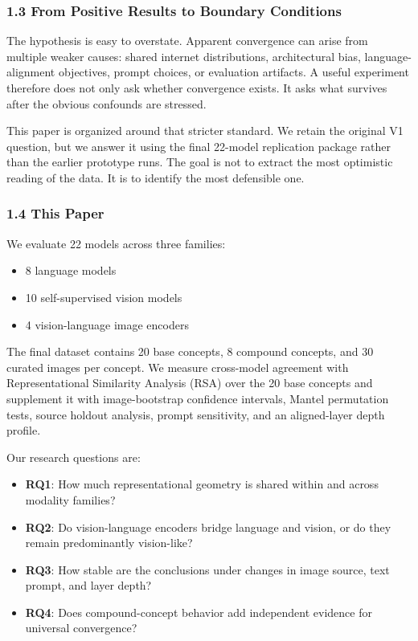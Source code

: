 \documentclass[
]{article}
\providecommand{\tightlist}{%
  \setlength{\itemsep}{0pt}\setlength{\parskip}{0pt}}
\begin{document}
\subsubsection{1.3 From Positive Results to Boundary
Conditions}\label{from-positive-results-to-boundary-conditions}

The hypothesis is easy to overstate. Apparent convergence can arise from
multiple weaker causes: shared internet distributions, architectural
bias, language-alignment objectives, prompt choices, or evaluation
artifacts. A useful experiment therefore does not only ask whether
convergence exists. It asks what survives after the obvious confounds
are stressed.

This paper is organized around that stricter standard. We retain the
original V1 question, but we answer it using the final 22-model
replication package rather than the earlier prototype runs. The goal is
not to extract the most optimistic reading of the data. It is to
identify the most defensible one.

\subsubsection{1.4 This Paper}\label{this-paper}

We evaluate 22 models across three families:

\begin{itemize}
\tightlist
\item
  8 language models
\item
  10 self-supervised vision models
\item
  4 vision-language image encoders
\end{itemize}

The final dataset contains 20 base concepts, 8 compound concepts, and 30
curated images per concept. We measure cross-model agreement with
Representational Similarity Analysis (RSA) over the 20 base concepts and
supplement it with image-bootstrap confidence intervals, Mantel
permutation tests, source holdout analysis, prompt sensitivity, and an
aligned-layer depth profile.

Our research questions are:

\begin{itemize}
\tightlist
\item
  \textbf{RQ1}: How much representational geometry is shared within and
  across modality families?
\item
  \textbf{RQ2}: Do vision-language encoders bridge language and vision,
  or do they remain predominantly vision-like?
\item
  \textbf{RQ3}: How stable are the conclusions under changes in image
  source, text prompt, and layer depth?
\item
  \textbf{RQ4}: Does compound-concept behavior add independent evidence
  for universal convergence?
\end{itemize}
\end{document}
